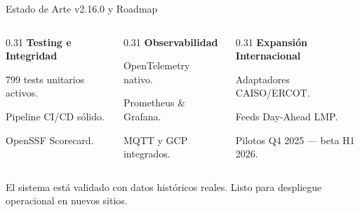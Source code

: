 \documentclass[10pt,aspectratio=169]{beamer}
\let\tempone\itemize
\let\temptwo\enditemize
\renewenvironment{itemize}{\tempone\addtolength{\itemsep}{0.3em}}{\temptwo}
\begin{document}
\begin{frame}{Estado de Arte v2.16.0 y Roadmap}
  \vspace{0.4cm}
  \begin{columns}[T]
    \begin{column}{0.31\textwidth}
      \centering
      \textbf{\textcolor{greenok}{Testing e Integridad}}\\
      \vspace{0.2cm}
      \begin{itemize}\footnotesize
        \item 799 tests unitarios activos.
        \item Pipeline CI/CD s\'olido.
        \item OpenSSF Scorecard.
      \end{itemize}
    \end{column}
    \begin{column}{0.31\textwidth}
      \centering
      \textbf{\textcolor{accentorange}{Observabilidad}}\\
      \vspace{0.2cm}
      \begin{itemize}\footnotesize
        \item OpenTelemetry nativo.
        \item Prometheus \& Grafana.
        \item MQTT y GCP integrados.
      \end{itemize}
    \end{column}
    \begin{column}{0.31\textwidth}
      \centering
      \textbf{\textcolor{blue!50}{Expansi\'on Internacional}}\\
      \vspace{0.2cm}
      \begin{itemize}\footnotesize
        \item Adaptadores CAISO/ERCOT.
        \item Feeds Day-Ahead LMP.
        \item Pilotos Q4 2025 --- beta H1 2026.
      \end{itemize}
    \end{column}
  \end{columns}
  \vspace{0.8cm}
  \begin{center}
    \color{textmuted}\footnotesize El sistema est\'a validado con datos hist\'oricos reales. Listo para despliegue operacional en nuevos sitios.
  \end{center}
\end{frame}
\end{document}
